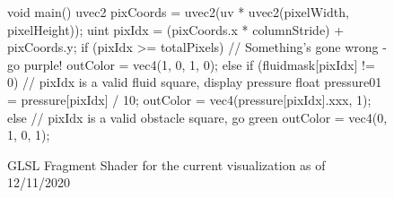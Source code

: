\begin{figure}[ht]
    \centering
    \begin{glslcode}
void main() {
    uvec2 pixCoords = uvec2(uv * uvec2(pixelWidth, pixelHeight));
    uint pixIdx = (pixCoords.x * columnStride) + pixCoords.y;
    if (pixIdx >= totalPixels) {
        // Something's gone wrong - go purple!
        outColor = vec4(1, 0, 1, 0);
    } else if (fluidmask[pixIdx] != 0) {
        // pixIdx is a valid fluid square, display pressure
        float pressure01 = pressure[pixIdx] / 10;
        outColor = vec4(pressure[pixIdx].xxx, 1);
    } else {
        // pixIdx is a valid obstacle square, go green
        outColor = vec4(0, 1, 0, 1);
    }
}
\end{glslcode}
    \caption{GLSL Fragment Shader for the current visualization as of 12/11/2020}
    \label{fig:SimPressureShader}
\end{figure}